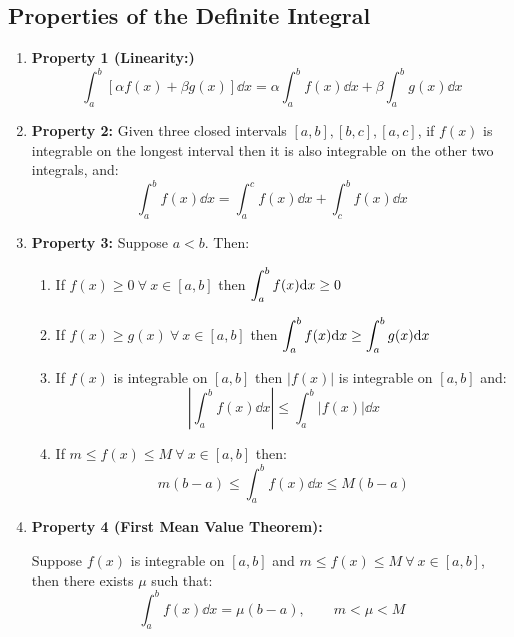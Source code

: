 \documentclass[12pt]{article}
\begin{document}
\subsection{Properties of the Definite Integral}
\begin{enumerate}
    \item \textbf{Property 1 (Linearity:)}
    \begin{equation*}
        \int_a^b [\alpha f(x) + \beta g(x)]\dd x = \alpha \int_a^b f(x) \dd x + \beta \int_a^b g(x) \dd x
    \end{equation*}
    \item \textbf{Property 2:} Given three closed intervals $[a,b],[b,c],[a,c]$, if $f(x)$ is integrable on the longest interval then it is also integrable on the other two integrals, and:
    \begin{equation*}
        \int_a^b f(x) \dd x = \int_a^c f(x) \dd x + \int_c^b f(x) \dd x
    \end{equation*}
    \item \textbf{Property 3:} Suppose $a<b$. Then:
    \begin{enumerate}
        \item If $f(x) \geq 0 \ \forall \ x \in [a,b]$ then $\mathlarger{\int_a^b f(x) \dd x \geq 0}$
        \item If $f(x) \geq g(x) \ \forall \ x \in [a,b]$ then $\mathlarger{\int_a^b f(x) \dd x \geq \int_a^b g(x) \dd x}$
        \item If $f(x)$ is integrable on $[a,b]$ then $|f(x)|$ is integrable on $[a,b]$ and:
        \begin{equation*}
            \left| \int_a^b f(x) \dd x \right| \leq \int_a^b |f(x)| \dd x
        \end{equation*}
        \item If $m \leq f(x) \leq M \ \forall \ x \in [a,b]$ then:
        \begin{equation*}
            m(b-a) \leq \int_a^b f(x) \dd x \leq M(b-a)
        \end{equation*}
    \end{enumerate}
    \item \textbf{Property 4 (First Mean Value Theorem):}
    \par Suppose $f(x)$ is integrable on $[a,b]$ and $m \leq f(x) \leq M \ \forall \ x \in [a,b]$, then there exists $\mu$ such that:
    \begin{equation*}
        \int_a^b f(x) \dd x = \mu (b-a), \qquad m< \mu < M
    \end{equation*}

\end{enumerate}
\end{document}
